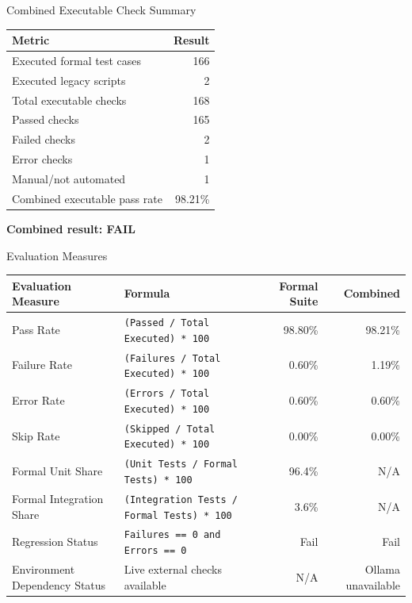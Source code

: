 \begin{frame}{Combined Executable Check Summary}
\small
\begin{tabular}{lr}
\hline
\textbf{Metric} & \textbf{Result}\\
\hline
Executed formal test cases & 166\\
Executed legacy scripts & 2\\
Total executable checks & 168\\
Passed checks & 165\\
Failed checks & 2\\
Error checks & 1\\
Manual/not automated & 1\\
Combined executable pass rate & 98.21\%\\
\hline
\end{tabular}

\vspace{0.4cm}
\textbf{Combined result: FAIL}
\end{frame}

\begin{frame}{Evaluation Measures}
\scriptsize
\begin{tabular}{p{}p{}rr}
\hline
\textbf{Evaluation Measure} & \textbf{Formula} & \textbf{Formal Suite} & \textbf{Combined}\\
\hline
Pass Rate & \texttt{(Passed / Total Executed) * 100} & 98.80\% & 98.21\%\\
Failure Rate & \texttt{(Failures / Total Executed) * 100} & 0.60\% & 1.19\%\\
Error Rate & \texttt{(Errors / Total Executed) * 100} & 0.60\% & 0.60\%\\
Skip Rate & \texttt{(Skipped / Total Executed) * 100} & 0.00\% & 0.00\%\\
Formal Unit Share & \texttt{(Unit Tests / Formal Tests) * 100} & 96.4\% & N/A\\
Formal Integration Share & \texttt{(Integration Tests / Formal Tests) * 100} & 3.6\% & N/A\\
Regression Status & \texttt{Failures == 0 and Errors == 0} & Fail & Fail\\
Environment Dependency Status & Live external checks available & N/A & Ollama unavailable\\
\hline
\end{tabular}
\end{frame}

